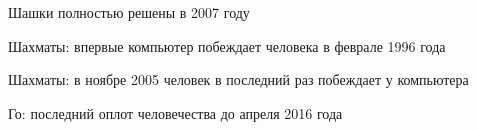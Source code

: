 \documentclass[notes,12pt, aspectratio=169]{beamer}
\newenvironment{wideitemize}{\itemize\addtolength{\itemsep}{10pt}}{\enditemize}
\begin{document}
\begin{frame}
\begin{center}
\end{center}
\end{frame}


\begin{frame}
\begin{wideitemize}
	\item Шашки полностью решены в 2007 году 
	\item Шахматы: впервые компьютер побеждает человека в феврале 1996 года 
	\item Шахматы: в ноябре 2005 человек в последний раз побеждает у компьютера
	\item Го: последний оплот человечества до апреля 2016 года
\end{wideitemize} 
\end{frame}
\end{document}
